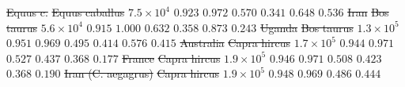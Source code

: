 \documentclass{article} %
\providecommand{\DIFdeltex}[1]{{\protect\color{red}\sout{#1}}}                      %
\providecommand{\DIFdelFL}[1]{\DIFdel{#1}} %
\providecommand{\DIFdel}[1]{\texorpdfstring{\DIFdeltex{#1}}{}} %
\begin{document}
\DIFdelFL{Equus c. }%
\DIFdelFL{Equus caballus }%
\DIFdelFL{$7.5\times 10^{4}$ }%
\DIFdelFL{$ 0.923$ }%
\DIFdelFL{$ 0.972$ }%
\DIFdelFL{$ 0.570$ }%
\DIFdelFL{$ 0.341$ }%
\DIFdelFL{$ 0.648$ }%
\DIFdelFL{$ 0.536$ }%
\DIFdelFL{Iran }%
\DIFdelFL{Bos taurus }%
\DIFdelFL{$5.6\times 10^{4}$ }%
\DIFdelFL{$ 0.915$ }%
\DIFdelFL{$ 1.000$ }%
\DIFdelFL{$ 0.632$ }%
\DIFdelFL{$ 0.358$ }%
\DIFdelFL{$ 0.873$ }%
\DIFdelFL{$ 0.243$ }%
\DIFdelFL{Uganda }%
\DIFdelFL{Bos taurus }%
\DIFdelFL{$1.3\times 10^{5}$ }%
\DIFdelFL{$ 0.951$ }%
\DIFdelFL{$ 0.969$ }%
\DIFdelFL{$ 0.495$ }%
\DIFdelFL{$ 0.414$ }%
\DIFdelFL{$ 0.576$ }%
\DIFdelFL{$ 0.415$ }%
\DIFdelFL{Australia }%
\DIFdelFL{Capra hircus }%
\DIFdelFL{$1.7\times 10^{5}$ }%
\DIFdelFL{$ 0.944$ }%
\DIFdelFL{$ 0.971$ }%
\DIFdelFL{$ 0.527$ }%
\DIFdelFL{$ 0.437$ }%
\DIFdelFL{$ 0.368$ }%
\DIFdelFL{$ 0.177$ }%
\DIFdelFL{France }%
\DIFdelFL{Capra hircus }%
\DIFdelFL{$1.9\times 10^{5}$ }%
\DIFdelFL{$ 0.946$ }%
\DIFdelFL{$ 0.971$ }%
\DIFdelFL{$ 0.508$ }%
\DIFdelFL{$ 0.423$ }%
\DIFdelFL{$ 0.368$ }%
\DIFdelFL{$ 0.190$ }%
\DIFdelFL{Iran (C. aegagrus) }%
\DIFdelFL{Capra hircus }%
\DIFdelFL{$1.9\times 10^{5}$ }%
\DIFdelFL{$ 0.948$ }%
\DIFdelFL{$ 0.969$ }%
\DIFdelFL{$ 0.486$ }%
\DIFdelFL{$ 0.444$ }%
\end{document}
